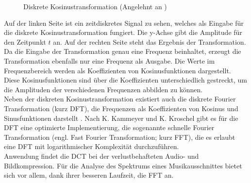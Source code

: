 \documentclass[11pt,a4paper]{article}
\begin{document}
\begin{figure}[!ht]
\centering
{}
\hspace{20pt}
\caption[Diskrete Kosinustransformation]{Diskrete Kosinustransformation (Angelehnt an \cite{KosTrans})}
\label{fig:KosinusTransformation}
\end{figure}
\noindent
Auf der linken Seite ist ein zeitdiskretes Signal zu sehen, welches als Eingabe für die diskrete Kosinustransformation fungiert. Die y-Achse gibt die Amplitude für den Zeitpunkt $t$ an. Auf der rechten Seite steht das Ergebnis der Transformation. Da die Eingabe der Transformation genau eine Frequenz beinhaltet, erzeugt die Transformation ebenfalls nur eine Frequenz als Ausgabe.
Die Werte im Frequenzbereich werden als Koeffizienten von Kosinusfunktionen dargestellt. Diese Kosinusfunktionen sind über die Koeffizienten unterschiedlich gestreckt, um die Amplituden der verschiedenen Frequenzen abbilden zu können.\\
Neben der diskreten Kosinustransformation existiert auch die diskrete Fourier Transformation (kurz DFT), die Frequenzen als Koeffizienten von Kosinus und Sinusfunktionen darstellt \cite[S. 185]{lerch2012introduction}. Nach K. Kammeyer und K. Kroschel \cite[S. 283]{kammeyer2013digitale} gibt es für die DFT eine optimierte Implementierung, die sogenannte schnelle Fourier Transformation (engl. Fast Fourier Transformation; kurz FFT), die es erlaubt eine DFT mit logarithmischer Komplexität durchzuführen.\\
Anwendung findet die DCT bei der verlustbehafteten Audio- und Bildkompression. Für die Analyse des Spektrums eines Musikausschnittes bietet sich vor allem, dank ihrer besseren Laufzeit, die FFT an.
\end{document}
